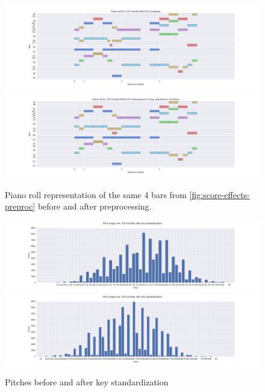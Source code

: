 \documentclass[dissertation.tex]{subfiles}
\begin{document}
\begin{figure}[htpb]
    \centering
        \includegraphics[width=1.0\linewidth]{Figures/bwv133-6-original-piano-roll.png}
        \includegraphics[width=1.0\linewidth]{Figures/bwv133-6-preproc-piano-roll.png}
    \caption{Piano roll representation of the same 4 bars from \autoref{fig:score-effects-preproc}
    before and after preprocessing.}
    \label{fig:piano-roll-effects-preproc}
\end{figure}

\begin{figure}[htpb]
    \centering
    \includegraphics[width=1.0\linewidth]{Figures/pitch-usage-original.png}
    \includegraphics[width=1.0\linewidth]{Figures/pitch-usage-preproc.png}
    \caption{Pitches before and after key standardization}
    \label{fig:pitch-key-standardization}
\end{figure}
\end{document}
